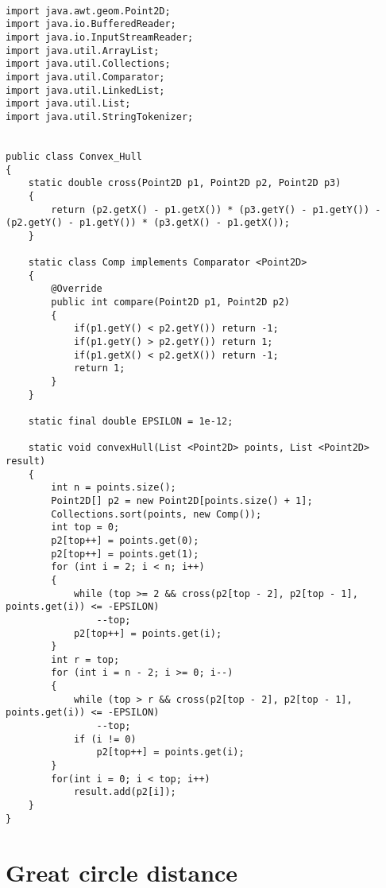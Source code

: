 \documentclass[a4paper, 11pt, oneside]{report}
\begin{document}
\begin{verbatim}

import java.awt.geom.Point2D;
import java.io.BufferedReader;
import java.io.InputStreamReader;
import java.util.ArrayList;
import java.util.Collections;
import java.util.Comparator;
import java.util.LinkedList;
import java.util.List;
import java.util.StringTokenizer;


public class Convex_Hull 
{
	static double cross(Point2D p1, Point2D p2, Point2D p3)
	{
	    return (p2.getX() - p1.getX()) * (p3.getY() - p1.getY()) - (p2.getY() - p1.getY()) * (p3.getX() - p1.getX());
	}

	static class Comp implements Comparator <Point2D>
	{
		@Override
		public int compare(Point2D p1, Point2D p2) 
		{
			if(p1.getY() < p2.getY()) return -1;
			if(p1.getY() > p2.getY()) return 1;
			if(p1.getX() < p2.getX()) return -1;
			return 1;
		}
	}

	static final double EPSILON = 1e-12;

	static void convexHull(List <Point2D> points, List <Point2D> result)
	{
		int n = points.size();
		Point2D[] p2 = new Point2D[points.size() + 1];
	    Collections.sort(points, new Comp());
	    int top = 0;
	    p2[top++] = points.get(0);
	    p2[top++] = points.get(1);
	    for (int i = 2; i < n; i++)
	    {
	        while (top >= 2 && cross(p2[top - 2], p2[top - 1], points.get(i)) <= -EPSILON)
	            --top;
	        p2[top++] = points.get(i);
	    }
	    int r = top;
	    for (int i = n - 2; i >= 0; i--)
	    {
	        while (top > r && cross(p2[top - 2], p2[top - 1], points.get(i)) <= -EPSILON)
	            --top;
	        if (i != 0)
	            p2[top++] = points.get(i);
	    }
	    for(int i = 0; i < top; i++)
	    	result.add(p2[i]);
	}
}

\end{verbatim}

\section{Great circle distance}
\end{document}
